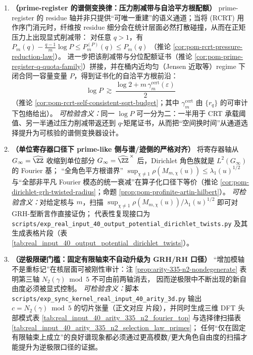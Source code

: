 \begin{enumerate}
  \item \textbf{（prime-register 的谱侧变换律：压力削减带与自洽平方根配额）}
  prime-register 的 residue 轴并非只提供“可唯一重建”的语义通道；当将 (RCRT) 用作序门消元时，纤维按 residue 细分会在统计层面必然打散碰撞，从而在正矩压力上出现显式削减带：
  对任意 \(q>1\)，有
  \(
  P_m(q)-\frac{q-1}{m}\log P\le P_m^{(P)}(q)\le P_m(q)
  \)
  （推论 \ref{cor:pom-rcrt-pressure-reduction-law}）。
  进一步把该削减带与分位配额证书（推论 \ref{cor:pom-prime-register-q-quota-family}）拼接，并在桶内近均匀（Jensen 近取等）regime 下闭合同一容量变量 \(P\)，得到证书化的自洽平方根前沿：
  \[
  \boxed{\;
  \log P\ \gtrsim\ \frac{\log 2+m\,\gamma_m^{\mathrm{cert}}(\varepsilon)}{2}\;}
  \]
  （推论 \ref{cor:pom-rcrt-self-consistent-sqrt-budget}；其中 \(\gamma_m^{\mathrm{cert}}\) 由 \(\{r_q\}\) 的可审计下包络给出）。
  \emph{可检验含义：}同一 \(\log P\) 可一分为二：一半用于 CRT 承载阈值、另一半通过压力削减带返还到 \(q\)-矩尾证书，从而把“空间换时间”从通道选择提升为可核验的谱侧变换器设计。

  \item \textbf{（单位寄存器口径下 prime-like 侧与谱/迹侧的严格对齐）}
  将寄存器轴从 \(G_\infty=\widehat{\ZZ}\) 收缩到单位部分 \(G_\infty=\widehat{\ZZ}^{\,\times}\) 后，Dirichlet 角色族就是 \(L^2(G_\infty)\) 的 Fourier 基；
  “全角色平方根谱界”
  \(
  \sup_{\chi\neq 1}\rho(M_{m,\chi}(u))\le \lambda_1(u)^{1/2}
  \)
  与“全部非平凡 Fourier 模态的统一衰减”在算子化口径下等价（推论 \ref{cor:pom-dirichlet-grh-twisted-radius}；命题 \ref{prop:pom-profinite-artin-hilbert}）。
  \emph{可检验含义：}对给定核与 \(m\)，扫描 \(\sup_{\chi\neq 1}\rho(M_{m,\chi}(u))/\lambda_1(u)^{1/2}\) 即可对 GRH-型断言作直接证伪；
  代表性复现接口为 \texttt{scripts/exp\_real\_input\_40\_output\_potential\_dirichlet\_twists.py} 及其生成表格片段（表 \ref{tab:real_input_40_output_potential_dirichlet_twists}）。

  \item \textbf{（逆极限硬门槛：固定有限轴束不自动升级为 GRH/RH 口径）}
  “增加模轴不是重标记”在核层面可被刚性审计：注 \ref{prop:arity-335-n2-nondegenerate} 表明第三轴 \(N_2(\gamma)\bmod 5\) 不可由前两轴消去，
  因而逆极限中不断出现的新自由度必须被显式控制。
  \emph{可检验含义：}脚本 \texttt{scripts/exp\_sync\_kernel\_real\_input\_40\_arity\_3d.py} 输出 \(c=N_2(\gamma)\bmod 5\) 的切片张量（正文对应 \verb|| 片段），并同时生成三维 DFT 头部模式表 \ref{tab:real_input_40_arity_335_n2_fourier_top}
  与选择律扫描表 \ref{tab:real_input_40_arity_335_n2_selection_law_primes}；
  任何“仅在固定有限轴束上成立”的良好谱现象都必须通过更高模数/更大角色自由度的扫描才能提升为逆极限口径的证据。


\end{enumerate}

